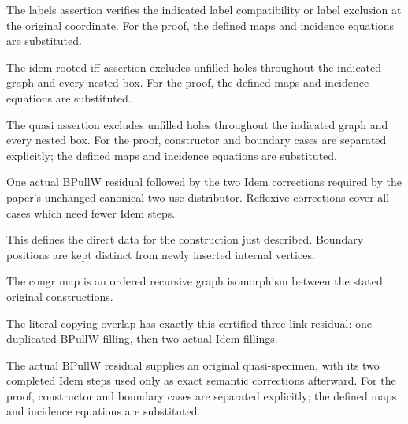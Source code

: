 The labels assertion verifies the indicated label compatibility or label exclusion at the original coordinate.
For the proof, the defined maps and incidence equations are substituted.
\par{}

The idem rooted iff assertion excludes unfilled holes throughout the indicated graph and every nested box.
For the proof, the defined maps and incidence equations are substituted.
\par{}

The quasi assertion excludes unfilled holes throughout the indicated graph and every nested box.
For the proof, constructor and boundary cases are separated explicitly; the defined maps and incidence equations are substituted.
\par{}

One actual BPullW residual followed by the two Idem corrections required by the paper's unchanged canonical two-use distributor. Reflexive corrections cover all cases which need fewer Idem steps.
\par{}

This defines the direct data for the construction just described. Boundary positions are kept distinct from newly inserted internal vertices.
\par{}

The congr map is an ordered recursive graph isomorphism between the stated original constructions.
\par{}

The literal copying overlap has exactly this certified three-link residual: one duplicated BPullW filling, then two actual Idem fillings.
\par{}

The actual BPullW residual supplies an original quasi-specimen, with its two completed Idem steps used only as exact semantic corrections afterward.
For the proof, constructor and boundary cases are separated explicitly; the defined maps and incidence equations are substituted.
\par{}

